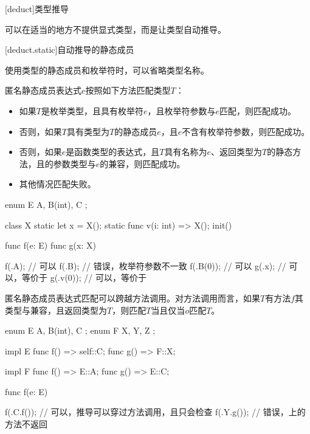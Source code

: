
[deduct]{类型推导}

\pnum
\X 可以在适当的地方不提供显式类型，而是让类型自动推导。

[deduct.static]{自动推导的静态成员}

\pnum
使用类型的静态成员和枚举符时，可以省略类型名称。

\pnum
匿名静态成员表达式$e$按照如下方法匹配类型$T$：

\begin{itemize}
    \item 如果$T$是枚举类型，且具有枚举符$e$，且枚举符参数与$e$匹配，则匹配成功。
    \item 否则，如果$T$具有类型为$T$的静态成员$e$，且$e$不含有枚举符参数，则匹配成功。
    \item 否则，如果$e$是函数类型的表达式，且$T$具有名称为$e$、返回类型为$T$的静态方法，且的参数类型与$e$的兼容，则匹配成功。
    \item 其他情况匹配失败。
\end{itemize}

\enterexample
\begin{codeblock}
enum E { A, B(int), C };

class X {
    static let x = X();
    static func v(i: int) => X();
    init() { }
}

func f(e: E) { }
func g(x: X) { }

f(.A); // 可以
f(.B); // 错误，枚举符参数不一致
f(.B(0)); // 可以
g(.x); // 可以，等价于
g(.v(0)); // 可以，等价于

\end{codeblock}
\exitexample

\pnum
匿名静态成员表达式匹配可以跨越方法调用。对方法调用而言，如果$T$有方法$f$其类型与兼容，且返回类型为$T$，则匹配$T$当且仅当$o$匹配$T$。

\enterexample
\begin{codeblock}
enum E { A, B(int), C };
enum F { X, Y, Z };

impl E {
    func f() => self::C;
    func g() => F::X;
}

impl F {
    func f() => E::A;
    func g() => E::C;
}

func f(e: E) { }

f(.C.f()); // 可以，推导可以穿过方法调用，且只会检查
f(.Y.g()); // 错误，上的方法不返回

\end{codeblock}
\exitexample